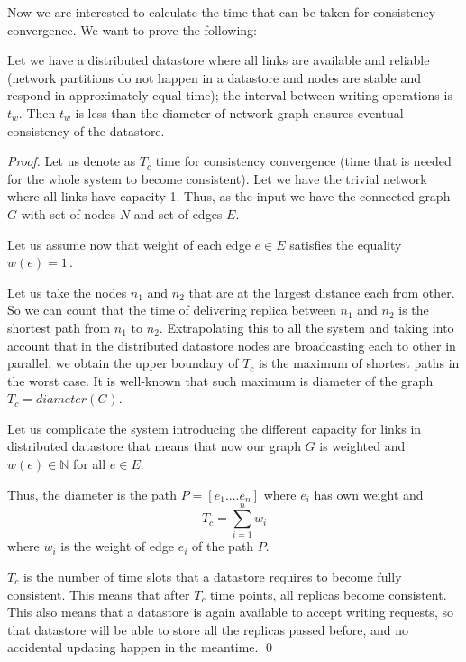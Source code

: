 \documentclass{llncs}
\begin{document}
Now we are interested to calculate the time that can be taken for consistency convergence.
We want to prove the following:
\begin{proposition}\label{prop}
Let we have a distributed datastore where all links are available and reliable (network partitions do not happen in a datastore and nodes are stable and respond in approximately equal time); the interval between writing operations is $t_w$.
Then $t_w$ is less than the diameter of network graph ensures eventual consistency of the datastore.
\end{proposition}
\begin{proof}
Let us denote as $T_c$ time for consistency convergence (time that is needed for the whole system to become consistent).
Let we have the trivial network where all links have capacity 1.
Thus, as the input we have the connected graph
$G$ with set of nodes $N$ and set of edges $E$. 
\par\noindent Let us assume now that weight of each edge $e\in E$ satisfies the equality $w(e) = 1$\,.
\par\noindent
Let us take the nodes $n_1$ and  $n_2$ that are at the largest distance each from other. So we can count that the time of delivering replica between $n_1$ and $n_2$ is the shortest path from $n_1$ to $n_2$.
Extrapolating this to all the system and taking into account that in the distributed datastore nodes are broadcasting each to other in parallel,  we obtain the upper boundary of $T_c$ is the maximum of shortest paths in the worst case.
It is well-known that such maximum is diameter of the graph $T_c = diameter(G)$.
\par\noindent Let us complicate the system introducing the different capacity for links in distributed datastore that means that now our graph $G$ is weighted and 
$w(e) \in\mathbb{N}$ for all $e\in E$.
\par\noindent
Thus, the diameter is the path $P = [e_1....e_n]$ where $e_i$ has own weight and
\[
	T_c = \sum_{i=1}^{n}w_i
\]
where $w_i$ is the weight of edge $e_i$ of the path $P$.
\par\noindent
$T_c$ is the number of time slots that a datastore requires to become fully consistent.
This means that after $T_c$ time points, all replicas become consistent.
This also means that a datastore is again available to accept writing requests, so that datastore will be able to store all the replicas passed before, and no accidental updating happen in the meantime.
\qed
\end{proof}
\end{document}
